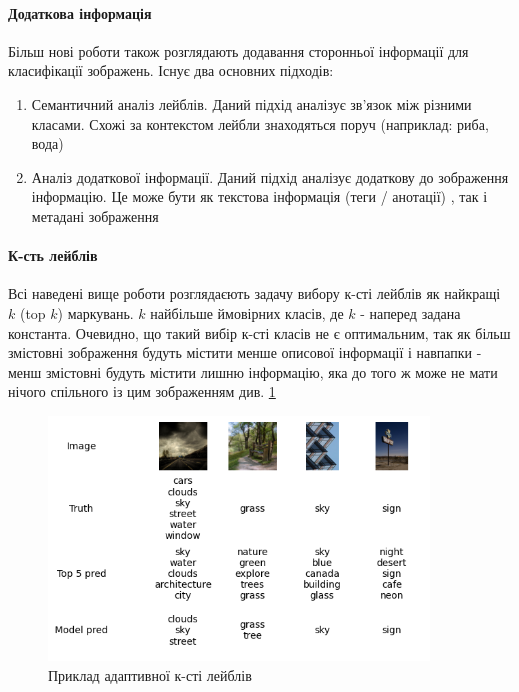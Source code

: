 \documentclass{udstu}
\begin{document}
\paragraph{\textbf{Додаткова інформація}\\}

Більш нові роботи також розглядають додавання сторонньої інформації для класифікації зображень.
Існує два основних підходів:

\begin{enumerate}
	\item Семантичний аналіз лейблів.
	Даний підхід аналізує зв'язок між різними класами.
	Схожі за контекстом лейбли знаходяться поруч (наприклад: риба, вода)
	\cite{cnn-semantic-1, cnn-semantic-2}
	\item Аналіз додаткової інформації.
	Даний підхід аналізує додаткову до зображення інформацію.
	Це може бути як текстова інформація (теги / анотації) \cite{cnn-side-2},
	так і метадані зображення \cite{cnn-side-1,cnn-side-3}
\end{enumerate}

\paragraph{\textbf{К-сть лейблів}\\}

Всі наведені вище роботи розглядаєють задачу вибору к-сті лейблів як найкращі $k$ (top $k$) маркувань.
$k$ найбільше ймовірних класів, де $k$ - наперед задана константа. Очевидно, що такий вибір к-сті класів не є
оптимальним, так як більш змістовні зображення будуть містити менше описової інформації і навпапки - менш змістовні будуть
містити лишню інформацію, яка до того ж може не мати нічого спільного із цим зображенням див. \figurename{\ref{figure:test-topk}}

\begin{figure}[!ht]
	\centering
	\includegraphics[width=0.9\textwidth]{PNG/test-topk}
	\caption{Приклад адаптивної к-сті лейблів}
	\label{figure:test-topk}
\end{figure}
\end{document}

